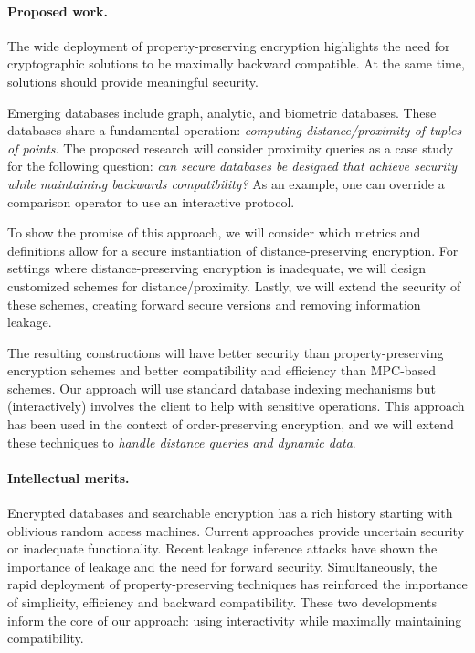 \documentclass[11pt]{article}
\begin{document}
\paragraph{Proposed work.}
The wide deployment of property-preserving encryption highlights the need for cryptographic solutions to be maximally backward compatible.  At the same time, solutions should provide meaningful security.

Emerging databases include graph, analytic, and
biometric databases. These databases share a fundamental operation: {\em
computing distance/proximity of tuples of points}. The proposed research will
consider proximity queries as a case study for the following question: \emph{can secure databases be designed that achieve security while maintaining backwards compatibility?}  As an example, one can override a comparison operator to use an interactive protocol.

To show the promise of this approach, we will consider which metrics and definitions allow for a secure instantiation of distance-preserving encryption. For settings where distance-preserving encryption is inadequate, we will design
customized schemes for distance/proximity. Lastly, we will extend the security of these schemes, creating forward secure versions and removing information leakage.

The resulting constructions will have
better security than property-preserving encryption schemes and better compatibility and 
efficiency than MPC-based schemes. Our approach will use standard database indexing mechanisms but (interactively) involves the
client to help with sensitive operations. This approach has been used in the
context of order-preserving encryption, and we will extend these techniques to
{\em handle distance queries and dynamic data}.

%
%

\paragraph{Intellectual merits.}  
Encrypted databases and searchable encryption has a rich history starting with  oblivious random access machines.  Current approaches provide uncertain security or inadequate functionality.  Recent
leakage inference attacks have shown the importance of leakage and the need for forward
security.  Simultaneously, the rapid deployment of property-preserving
techniques has reinforced the importance of simplicity, efficiency and backward
compatibility.  These two developments inform the core of our approach: using
interactivity while maximally maintaining compatibility.
\end{document}
